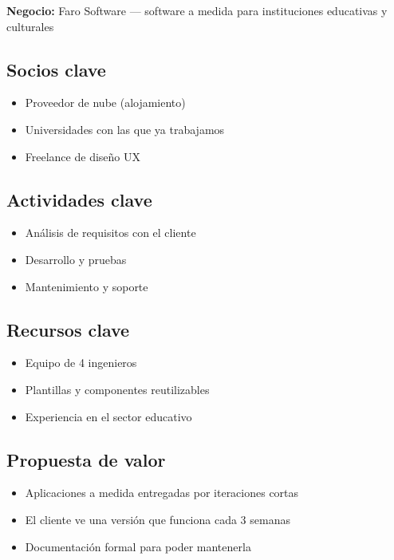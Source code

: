 \documentclass[11pt,a4paper]{article}
\begin{document}
\textbf{Negocio:} Faro Software — software a medida para instituciones educativas y culturales

\subsection*{Socios clave}

\begin{itemize}
\item Proveedor de nube (alojamiento)
\item Universidades con las que ya trabajamos
\item Freelance de diseño UX
\end{itemize}

\subsection*{Actividades clave}

\begin{itemize}
\item Análisis de requisitos con el cliente
\item Desarrollo y pruebas
\item Mantenimiento y soporte
\end{itemize}

\subsection*{Recursos clave}

\begin{itemize}
\item Equipo de 4 ingenieros
\item Plantillas y componentes reutilizables
\item Experiencia en el sector educativo
\end{itemize}

\subsection*{Propuesta de valor}

\begin{itemize}
\item Aplicaciones a medida entregadas por iteraciones cortas
\item El cliente ve una versión que funciona cada 3 semanas
\item Documentación formal para poder mantenerla
\end{itemize}
\end{document}
